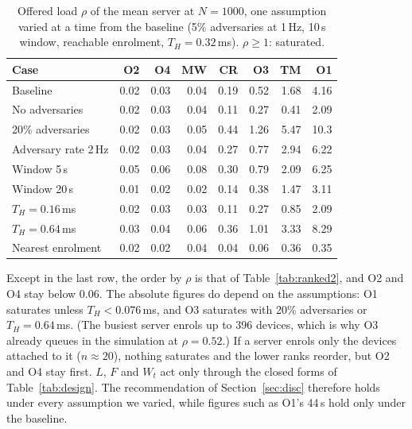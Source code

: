 \begin{table}[t]
\centering
\caption{Offered load $\rho$ of the mean server at $N=1000$, one assumption varied at a time from the baseline (5\%
adversaries at 1\,Hz, 10\,s window, reachable enrolment, $T_H=0.32$\,ms). $\rho\ge1$: saturated.}
\label{tab:sens}
\scriptsize
\setlength{\tabcolsep}{2.2pt}
\begin{tabular}{@{}l r r r r r r r@{}}
\toprule
Case & O2 & O4 & MW & CR & O3 & TM & O1 \\
\midrule
Baseline              & 0.02 & 0.03 & 0.04 & 0.19 & 0.52 & 1.68 & 4.16 \\
No adversaries        & 0.02 & 0.03 & 0.04 & 0.11 & 0.27 & 0.41 & 2.09 \\
20\% adversaries      & 0.02 & 0.03 & 0.05 & 0.44 & 1.26 & 5.47 & 10.3 \\
Adversary rate 2\,Hz  & 0.02 & 0.03 & 0.04 & 0.27 & 0.77 & 2.94 & 6.22 \\
Window 5\,s           & 0.05 & 0.06 & 0.08 & 0.30 & 0.79 & 2.09 & 6.25 \\
Window 20\,s          & 0.01 & 0.02 & 0.02 & 0.14 & 0.38 & 1.47 & 3.11 \\
$T_H=0.16$\,ms        & 0.02 & 0.03 & 0.03 & 0.11 & 0.27 & 0.85 & 2.09 \\
$T_H=0.64$\,ms        & 0.03 & 0.04 & 0.06 & 0.36 & 1.01 & 3.33 & 8.29 \\
Nearest enrolment     & 0.02 & 0.02 & 0.04 & 0.04 & 0.06 & 0.36 & 0.35 \\
\bottomrule
\end{tabular}
\end{table}

Except in the last row, the order by $\rho$ is that of Table~\ref{tab:ranked2}, and O2 and O4 stay below 0.06. The
absolute figures do depend on the assumptions: O1 saturates unless $T_H<0.076$\,ms, and O3 saturates with 20\%
adversaries or $T_H=0.64$\,ms. (The busiest server enrols up to 396 devices, which is why O3 already queues in the
simulation at $\rho=0.52$.) If a server enrols only the devices attached to it ($n\approx20$), nothing saturates and the
lower ranks reorder, but O2 and O4 stay first. $L$, $F$ and $W_t$ act only through the closed forms of
Table~\ref{tab:design}. The recommendation of Section~\ref{sec:disc} therefore holds under every assumption we varied,
while figures such as O1's 44\,s hold only under the baseline.

\iffv
